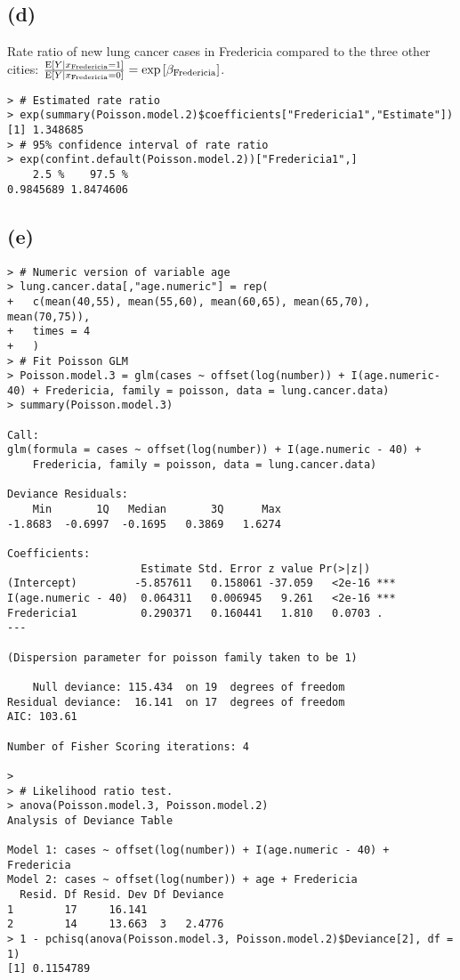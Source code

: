 \vspace{\baselineskip}
\subsection*{(d)}
Rate ratio of new lung cancer cases in Fredericia compared to the three other cities:
$\frac{\mathrm{E}\left[Y|x_{\mathrm{Fredericia}} = 1\right]}{\mathrm{E}\left[Y|x_{\mathrm{Fredericia}} = 0\right]} = \exp\left[\beta_{\mathrm{Fredericia}}\right]$.

\begin{lstlisting}
> # Estimated rate ratio
> exp(summary(Poisson.model.2)$coefficients["Fredericia1","Estimate"])
[1] 1.348685
> # 95% confidence interval of rate ratio
> exp(confint.default(Poisson.model.2))["Fredericia1",]
    2.5 %    97.5 % 
0.9845689 1.8474606 
\end{lstlisting}


\vspace{\baselineskip}
\subsection*{(e)}
\begin{lstlisting}
> # Numeric version of variable age
> lung.cancer.data[,"age.numeric"] = rep(
+   c(mean(40,55), mean(55,60), mean(60,65), mean(65,70), mean(70,75)),
+   times = 4
+   )
> # Fit Poisson GLM
> Poisson.model.3 = glm(cases ~ offset(log(number)) + I(age.numeric-40) + Fredericia, family = poisson, data = lung.cancer.data)
> summary(Poisson.model.3)

Call:
glm(formula = cases ~ offset(log(number)) + I(age.numeric - 40) + 
    Fredericia, family = poisson, data = lung.cancer.data)

Deviance Residuals: 
    Min       1Q   Median       3Q      Max  
-1.8683  -0.6997  -0.1695   0.3869   1.6274  

Coefficients:
                     Estimate Std. Error z value Pr(>|z|)    
(Intercept)         -5.857611   0.158061 -37.059   <2e-16 ***
I(age.numeric - 40)  0.064311   0.006945   9.261   <2e-16 ***
Fredericia1          0.290371   0.160441   1.810   0.0703 .  
---

(Dispersion parameter for poisson family taken to be 1)

    Null deviance: 115.434  on 19  degrees of freedom
Residual deviance:  16.141  on 17  degrees of freedom
AIC: 103.61

Number of Fisher Scoring iterations: 4

> 
> # Likelihood ratio test.
> anova(Poisson.model.3, Poisson.model.2)
Analysis of Deviance Table

Model 1: cases ~ offset(log(number)) + I(age.numeric - 40) + Fredericia
Model 2: cases ~ offset(log(number)) + age + Fredericia
  Resid. Df Resid. Dev Df Deviance
1        17     16.141            
2        14     13.663  3   2.4776
> 1 - pchisq(anova(Poisson.model.3, Poisson.model.2)$Deviance[2], df = 1)
[1] 0.1154789
\end{lstlisting}

